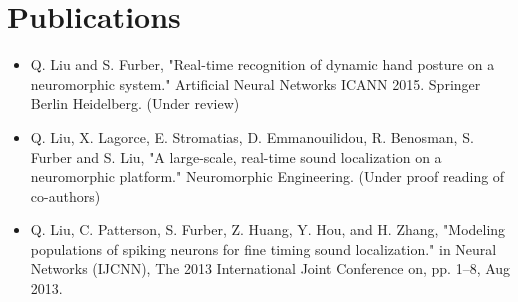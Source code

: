 
\section{Publications}
\begin{itemize}

	\item Q. Liu and S. Furber, "Real-time recognition of dynamic hand posture on a neuromorphic system." Artificial Neural Networks ICANN 2015. Springer Berlin Heidelberg. (Under review)


	\item Q. Liu, X. Lagorce, E. Stromatias, D. Emmanouilidou, R. Benosman, S. Furber and S. Liu, "A large-scale, real-time sound localization on a neuromorphic platform." Neuromorphic Engineering. (Under proof reading of co-authors)

	\item Q. Liu, C. Patterson, S. Furber, Z. Huang, Y. Hou, and H. Zhang, "Modeling populations of spiking neurons for fine timing sound localization." in Neural Networks (IJCNN), The 2013 International Joint Conference on, pp. 1–8, Aug 2013.
\end{itemize}


